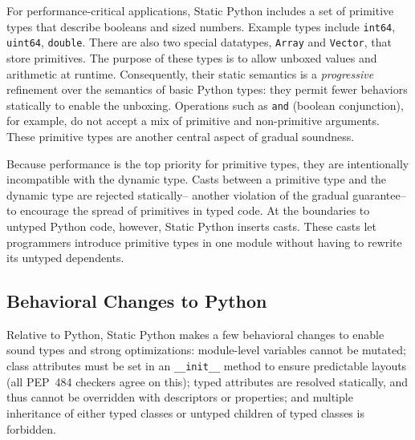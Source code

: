 \documentclass[english,cleveref,crc]{programming}
\newcommand{\SP}{Static Python}
\newcommand{\PEP}{PEP~484}
\newcommand{\code}[1]{\texttt{#1}}
\begin{document}

For performance-critical applications, \SP{} includes a set of primitive types
that describe booleans and sized numbers.
Example types include \code{int64}, \code{uint64}, \code{double}.
There are also two special datatypes, \code{Array} and \code{Vector}, that store primitives.
The purpose of these types is to allow unboxed values and arithmetic at
runtime.
Consequently, their static semantics is a \emph{progressive}~\cite{pqk-onward-2012}
refinement over the semantics of basic Python types:
they permit fewer behaviors statically to enable the unboxing.
Operations such as \code{and} (boolean conjunction), for example, do not accept
a mix of primitive and non-primitive arguments.
These primitive types are another central aspect of gradual soundness.

Because performance is the top priority for primitive types, they
are intentionally incompatible with the dynamic type.
Casts between a primitive type and the dynamic type are rejected
statically\--- another violation of the gradual guarantee\--- to encourage the
spread of primitives in typed code.
At the boundaries to untyped Python code, however, \SP{} inserts casts.
These casts let programmers introduce primitive types in one module
without having to rewrite its untyped dependents.





\subsection{Behavioral Changes to Python}
\label{s:not-python}

Relative to Python, \SP{} makes a few behavioral changes to enable
sound types and strong optimizations:
module-level variables cannot be mutated;
class attributes must be set in an \code{\_\_init\_\_} method to
ensure predictable layouts (all \PEP{} checkers agree on this);
typed attributes are resolved statically, and thus cannot be overridden with
descriptors or properties;
and
multiple inheritance of either typed classes or untyped children
of typed classes is forbidden.
\end{document}
